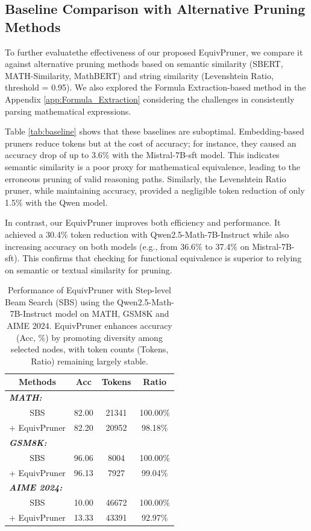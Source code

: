 \documentclass[11pt]{article}
\begin{document}
\subsection{Baseline Comparison with Alternative Pruning Methods}
To further evaluatethe effectiveness of our proposed EquivPruner, we compare it against alternative pruning methods based on semantic similarity (SBERT, MATH-Similarity, MathBERT) and string similarity (Levenshtein Ratio, threshold = 0.95). We also explored the Formula Extraction-based method in the Appendix \ref{app:Formula_Extraction} considering the challenges in consistently parsing mathematical expressions.

Table \ref{tab:baseline} shows that these baselines are suboptimal. Embedding-based pruners reduce tokens but at the cost of accuracy; for instance, they caused an accuracy drop of up to 3.6\% with the Mistral-7B-sft model. This indicates semantic similarity is a poor proxy for mathematical equivalence, leading to the erroneous pruning of valid reasoning paths. Similarly, the Levenshtein Ratio pruner, while maintaining accuracy, provided a negligible token reduction of only 1.5\% with the Qwen model.

In contrast, our EquivPruner improves both efficiency and performance. It achieved a 30.4\% token reduction with Qwen2.5-Math-7B-Instruct while also increasing accuracy on both models (e.g., from 36.6\% to 37.4\% on Mistral-7B-sft). This confirms that checking for functional equivalence is superior to relying on semantic or textual similarity for pruning.


\begin{table}[t]
\centering
\caption{Performance of EquivPruner with Step-level Beam Search (SBS) using the Qwen2.5-Math-7B-Instruct model on MATH, GSM8K and AIME 2024. EquivPruner enhances accuracy (Acc, \%) by promoting diversity among selected nodes, with token counts (Tokens, Ratio) remaining largely stable.}
\label{tab:fur}
\begin{tabular}{cccc}
\hline
Methods                                      & Acc   & Tokens & Ratio    \\ \hline
\multicolumn{1}{l}{\textit{\textbf{MATH:}}}  &       &        &          \\
SBS                       & 82.00 & 21341  & 100.00\% \\
\multicolumn{1}{r}{+ EquivPruner}            & 82.20 & 20952  & 98.18\%  \\ \hline
\multicolumn{1}{l}{\textit{\textbf{GSM8K:}}} &       &        &          \\
SBS                       & 96.06 & 8004  & 100.00\% \\
\multicolumn{1}{r}{+ EquivPruner}            & 96.13 & 7927  & 99.04\%    \\ \hline
\multicolumn{1}{l}{\textit{\textbf{AIME 2024:}}} &       &        &          \\
SBS                       & 10.00 & 46672  & 100.00\% \\
\multicolumn{1}{r}{+ EquivPruner}            & 13.33 & 43391  & 92.97\%    \\ \hline
\end{tabular}
\end{table}
\end{document}
